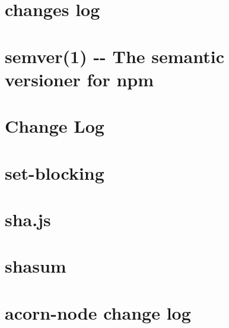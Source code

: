 \documentclass[twoside]{book}
\newcommand{\+}{\discretionary{\mbox{\scriptsize$\hookleftarrow$}}{}{}}
\begin{document}
\chapter{changes log}
\label{md_dsmacc_examples_DRmerge_node_modules_semver_CHANGELOG}

\chapter{semver(1) -\/-\/ The semantic versioner for npm}
\label{md_dsmacc_examples_DRmerge_node_modules_semver_README}

\chapter{Change Log}
\label{md_dsmacc_examples_DRmerge_node_modules_set-blocking_CHANGELOG}

\chapter{set-\/blocking}
\label{md_dsmacc_examples_DRmerge_node_modules_set-blocking_README}

\chapter{sha.\+js}
\label{md_dsmacc_examples_DRmerge_node_modules_sha_8js_README}

\chapter{shasum}
\label{md_dsmacc_examples_DRmerge_node_modules_shasum_README}

\chapter{acorn-\/node change log}
\label{md_dsmacc_examples_DRmerge_node_modules_shell-quote_CHANGELOG}

\end{document}
